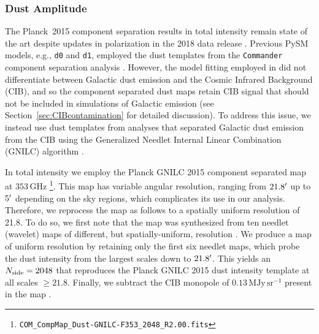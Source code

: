 \documentclass[twocolumn]{aastex631}
\begin{document}

\subsubsection{Dust Amplitude}\label{sec:dustamplitude}
The Planck~2015 component separation results in total intensity remain state of the art despite updates in polarization in the 2018 data release \citep{planck2016-l04}. Previous PySM models, e.g., \texttt{d0} and \texttt{d1}, employed the dust templates from the \texttt{Commander} component separation analysis \citep{planck2014-a11}. However, the model fitting employed in \citet{planck2014-a11} did not differentiate between Galactic dust emission and the Cosmic Infrared Background (CIB), and so the component separated dust maps retain CIB signal that should not be included in simulations of Galactic emission (see Section~\ref{sec:CIBcontamination} for detailed discussion). To address this issue, we instead use dust templates from analyses that separated Galactic dust emission from the CIB using the Generalized Needlet Internal Linear Combination (GNILC) algorithm \citep{Remazeilles:2011}. 

In total intensity we employ the Planck GNILC 2015 component separated map at $353$\,GHz \citep{planck2016-XLVIII}\footnote{\texttt{COM\_CompMap\_Dust-GNILC-F353\_2048\_R2.00.fits}}. This map has variable angular resolution, ranging from $21.8\mbox{$^\prime$}$ up to $5\mbox{$^\prime$}$ depending on the sky regions, which complicates its use in our analysis. Therefore, we reprocess the map as follows to a spatially uniform resolution of 21.8\arcmin. To do so, we first note that the map was synthesized from ten needlet (wavelet) maps of different, but spatially-uniform, resolution \citep[][Figure~A.2]{planck2016-l04}. We produce a map of uniform resolution by retaining only the first six needlet maps, which probe the dust intensity from the largest scales down to $21.8\mbox{$^\prime$}$. This yields an $N_{\rm side} = 2048$ that reproduces the Planck GNILC 2015 dust intensity template at all scales $\geq 21.8$\arcmin. Finally, we subtract the CIB monopole of $0.13\, \text{MJy}\,\text{sr}^{-1}$ present in the map %
\citep[][Section~2.2]{planck2016-l11B}.
\end{document}
